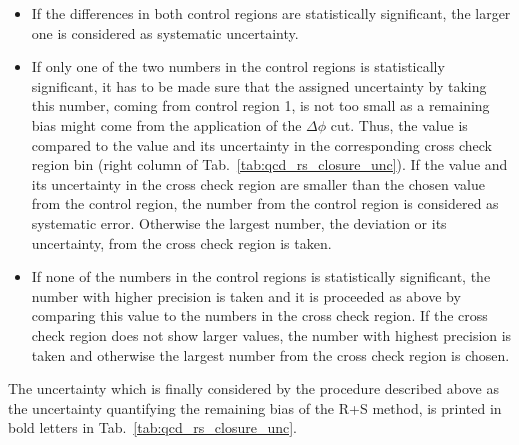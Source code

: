 \begin{itemize}
 \item If the differences in both control regions are statistically significant, the larger one is considered as systematic uncertainty. 
 \item If only one of the two numbers in the control regions is statistically significant, it has to be made sure that the assigned uncertainty by taking this number, \eg coming from control region 1, is not too small as a remaining bias might come from the application of the $\Delta \phi$ cut. Thus, the value is compared to the value and its uncertainty in the corresponding cross check region bin (right column of Tab.~\ref{tab:qcd_rs_closure_unc}). If the value and its uncertainty in the cross check region are smaller than the chosen value from the control region, the number from the control region is considered as systematic error. Otherwise the largest number, \ie the deviation or its uncertainty, from the cross check region is taken.
 \item If none of the numbers in the control regions is statistically significant, the number with higher precision is taken and it is proceeded as above by comparing this value to the numbers in the cross check region. If the cross check region does not show larger values, the number with highest precision is taken and otherwise the largest number from the cross check region is chosen.
\end{itemize}
The uncertainty which is finally considered by the procedure described above as the uncertainty quantifying the remaining bias of the R+S method, is printed in bold letters in Tab.~\ref{tab:qcd_rs_closure_unc}.

